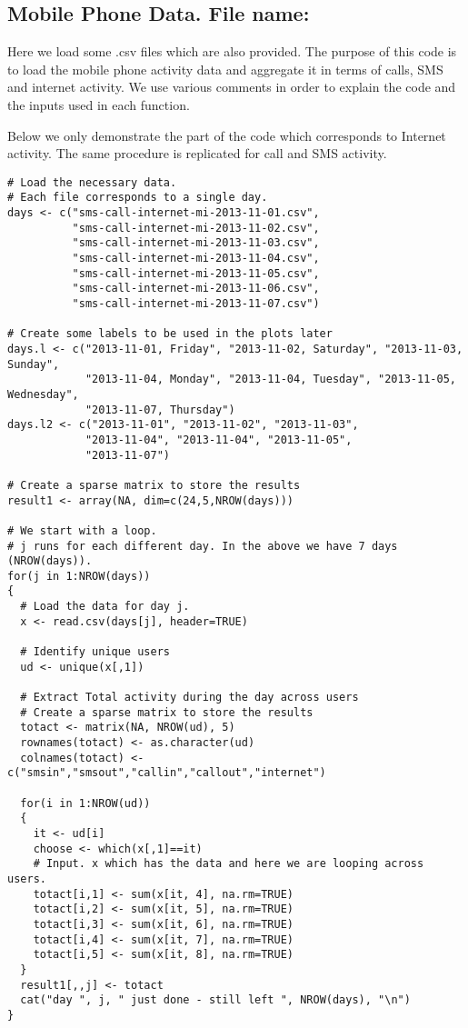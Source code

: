 \documentclass[12pt]{article}
\begin{document}
\subsection{Mobile Phone Data. File name: \color{blue}{MobPhone.R}}

Here we load some .csv files which are also provided. The purpose of this
code is to load the mobile phone activity data and aggregate it in terms of
calls, SMS and internet activity. We use various comments in order to
explain the code and the inputs used in each function.

Below we only demonstrate the part of the code which corresponds to Internet
activity. The same procedure is replicated for call and SMS activity.

\begin{lstlisting}[title=\textbf{Mobile Phone Data Aggregation and Plots.}]
# Load the necessary data.
# Each file corresponds to a single day.
days <- c("sms-call-internet-mi-2013-11-01.csv",
          "sms-call-internet-mi-2013-11-02.csv",
          "sms-call-internet-mi-2013-11-03.csv",
          "sms-call-internet-mi-2013-11-04.csv",
          "sms-call-internet-mi-2013-11-05.csv",
          "sms-call-internet-mi-2013-11-06.csv",
          "sms-call-internet-mi-2013-11-07.csv")

# Create some labels to be used in the plots later		
days.l <- c("2013-11-01, Friday", "2013-11-02, Saturday", "2013-11-03, Sunday",
            "2013-11-04, Monday", "2013-11-04, Tuesday", "2013-11-05, Wednesday",
            "2013-11-07, Thursday")
days.l2 <- c("2013-11-01", "2013-11-02", "2013-11-03",
            "2013-11-04", "2013-11-04", "2013-11-05",
            "2013-11-07")

# Create a sparse matrix to store the results	
result1 <- array(NA, dim=c(24,5,NROW(days)))

# We start with a loop.
# j runs for each different day. In the above we have 7 days (NROW(days)).
for(j in 1:NROW(days))
{
  # Load the data for day j.
  x <- read.csv(days[j], header=TRUE)

  # Identify unique users
  ud <- unique(x[,1])

  # Extract Total activity during the day across users
  # Create a sparse matrix to store the results
  totact <- matrix(NA, NROW(ud), 5)
  rownames(totact) <- as.character(ud)
  colnames(totact) <- c("smsin","smsout","callin","callout","internet")

  for(i in 1:NROW(ud))
  {
    it <- ud[i]
    choose <- which(x[,1]==it)
	# Input. x which has the data and here we are looping across users.
    totact[i,1] <- sum(x[it, 4], na.rm=TRUE)
    totact[i,2] <- sum(x[it, 5], na.rm=TRUE)
    totact[i,3] <- sum(x[it, 6], na.rm=TRUE)
    totact[i,4] <- sum(x[it, 7], na.rm=TRUE)
    totact[i,5] <- sum(x[it, 8], na.rm=TRUE)
  }
  result1[,,j] <- totact
  cat("day ", j, " just done - still left ", NROW(days), "\n")
}


\end{lstlisting}
\end{document}
